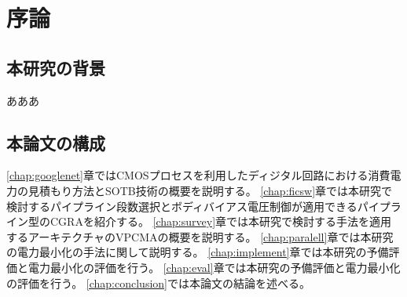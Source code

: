 \chapter{序論}
{
    \label{chap:introducion}
    \section{本研究の背景}
    あああ\label{sec:backgroud}
    \section{本論文の構成}
    \label{sed:composition}
    \ref{chap:googlenet}章ではCMOSプロセスを利用したディジタル回路における消費電力の見積もり方法とSOTB技術の概要を説明する。
    \ref{chap:ficsw}章では本研究で検討するパイプライン段数選択とボディバイアス電圧制御が適用できるパイプライン型のCGRAを紹介する。
    \ref{chap:survey}章では本研究で検討する手法を適用するアーキテクチャのVPCMAの概要を説明する。
    \ref{chap:paralell}章では本研究の電力最小化の手法に関して説明する。
    \ref{chap:implement}章では本研究の予備評価と電力最小化の評価を行う。 
    \ref{chap:eval}章では本研究の予備評価と電力最小化の評価を行う。 
    \ref{chap:conclusion}では本論文の結論を述べる。


}
